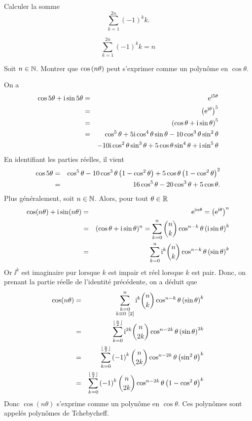 \documentclass{magnolia}
\begin{document}
\begin{exos}
\exo Calculer la somme
  \[\sum_{k=1}^{2n} (-1)^k k.\]
  \begin{sol}
\[\sum_{k=1}^{2n} (-1)^k k=n\]
  \end{sol}
\exo Soit $n\in\mathbb{N}$. Montrer que $\cos\left(n\theta\right)$ peut
s'exprimer comme un polynôme en $\cos\theta$.
\begin{sol}
On a
	\begin{eqnarray*}
	\cos 5\theta+{\rm i}\sin 5\theta 
	&=& {\rm e}^{{\rm i} 5\theta}\\
	&=& \left({\rm e}^{{\rm i}\theta}\right)^5\\
	&=& \left(\cos\theta+{\rm i}\sin\theta\right)^5\\
	&=& \cos^5\theta+5{\rm i}\cos^4\theta\sin\theta-10\cos^3\theta\sin^2\theta\\
	& & -10{\rm i}\cos^2\theta\sin^3\theta+5\cos\theta\sin^4\theta+{\rm i}\sin^5\theta
	\end{eqnarray*}
	En identifiant les parties réelles, il vient
	\begin{eqnarray*}
	\cos 5\theta
	&=& \cos^5\theta-10\cos^3\theta\left(1-\cos^2\theta\right)
			+5\cos\theta\left(1-\cos^2\theta\right)^2\\
	&=& 16\cos^5\theta-20\cos^3\theta+5\cos\theta.
	\end{eqnarray*}
Plus généralement, soit $n\in\mathbb{N}$. Alors, pour tout $\theta\in\mathbb{R}$
\begin{eqnarray*}
\cos(n\theta)+{\rm i}\sin(n\theta)
&=& {\rm e}^{{\rm i} n\theta} = \left({\rm e}^{{\rm i}\theta}\right)^n\\
&=& (\cos\theta+{\rm i}\sin\theta)^n = \sum_{k=0}^n \binom{n}{k}\cos^{n-k}\theta\left({\rm i}\sin\theta\right)^k\\
&=& \sum_{k=0}^n {\rm i}^k\binom{n}{k}\cos^{n-k}\theta\left(\sin\theta\right)^k
\end{eqnarray*} 
Or $\ii^k$ est imaginaire pur lorsque $k$ est impair et réel lorsque $k$ est pair. Donc, on prenant la partie réelle de l'identité précédente, on a déduit que
\begin{eqnarray*}
\cos(n\theta)
&=& \sum_{\substack{k=0\\ k\equiv 0\ [2]}}^n {\rm i}^k\binom{n}{k}\cos^{n-k}\theta\left(\sin\theta\right)^k\\
&=& \sum_{k=0}^{\lfloor\frac{n}{2}\rfloor} {\rm i}^{2k} \binom{n}{2k}\cos^{n-2k}\theta\left(\sin\theta\right)^{2k}\\
&=& \sum_{k=0}^{\lfloor\frac{n}{2}\rfloor} \left(-1\right)^k \binom{n}{2k}\cos^{n-2k}\theta\left(\sin^2\theta\right)^{k}\\
&=& \sum_{k=0}^{\lfloor\frac{n}{2}\rfloor} \left(-1\right)^k \binom{n}{2k}\cos^{n-2k}\theta\left(1-\cos^2\theta\right)^{k}
\end{eqnarray*} 
Donc $\cos(n\theta)$ s'exprime comme un polynôme en $\cos\theta$. Ces polynômes sont appelés polynômes de Tchebycheff.
\end{sol}
\end{exos}
\end{document}
